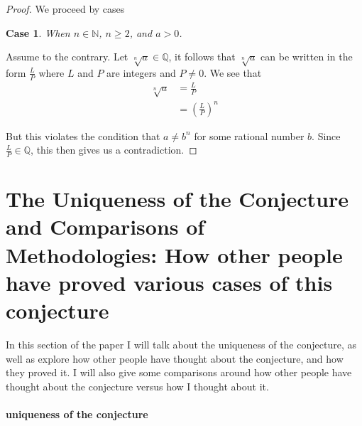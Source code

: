 \documentclass{turabian-researchpaper}
\newtheorem{case}{Case}
\begin{document}
\begin{proof}
    We proceed by cases 
    
    \begin{case}
        When \(n \in \mathds{N}\), \(n \geq 2\), and \(a > 0\).
    \end{case}
    
    Assume to the contrary. Let \(\sqrt[n]{a} \in \mathds{Q}\), it follows that \(\sqrt[n]{a}\) can be written in the form \(\frac{L}{P}\) where \(L\) and \(P\) are integers and \(P \neq 0\). We see that 
    \begin{align*}
        \sqrt[n]{a} &= \frac{L}{P} \\ 
                    &= \left(\frac{L}{P}\right)^n 
    \end{align*} 
    
    But this violates the condition that \(a \neq b^n\) for some rational number $b$. Since \(\frac{L}{P} \in \mathds{Q}\), this then gives us a contradiction. 



\end{proof}

\section{The Uniqueness of the Conjecture and Comparisons of Methodologies: How other people have proved various cases of this conjecture}      

In this section of the paper I will talk about the uniqueness of the conjecture, as well as explore how other people have thought about the conjecture, and how they proved it. I will also give some comparisons around how other people have thought about the conjecture versus how I thought about it. 

\paragraph{uniqueness of the conjecture}
\end{document}
